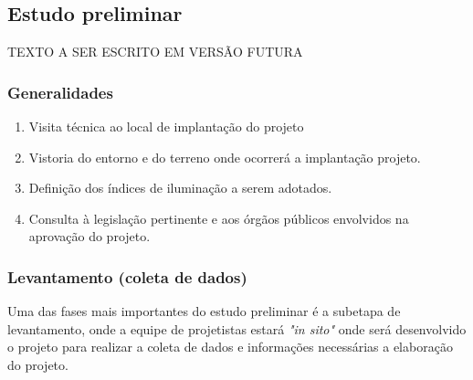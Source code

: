 \subsection{Estudo preliminar} \label{subsection: etapa-estudo preliminar}

TEXTO A SER ESCRITO EM VERSÃO FUTURA

\subsubsection{Generalidades}

	\begin{enumerate}\label{subsection: EP-generalidades}
		\item Visita técnica ao local de implantação do projeto

		\item Vistoria do entorno e do terreno onde ocorrerá a implantação projeto.
		
		\item Definição dos índices de iluminação a serem adotados.
		
		\item Consulta à legislação pertinente e aos órgãos públicos envolvidos na aprovação do projeto.
	\end{enumerate}

\subsubsection{Levantamento (coleta de dados)}

Uma das fases mais importantes do estudo preliminar é a subetapa de levantamento, onde a equipe de projetistas estará \textit{"in sito"} onde será desenvolvido o projeto para realizar a coleta de dados e informações necessárias a elaboração do projeto.


